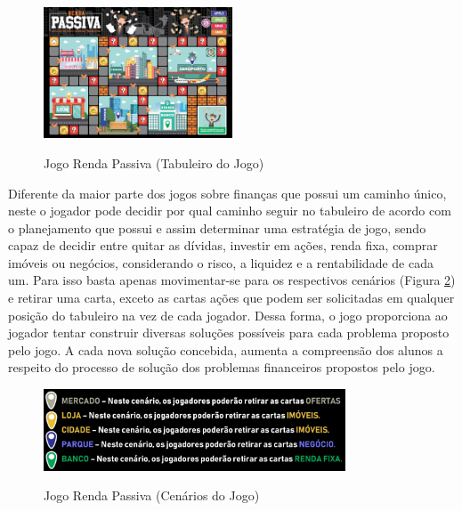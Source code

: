 \graphicspath{{figuras/}}
\begin{figure}[!ht]
\centering
\begin{minipage}{1.\textwidth}
\caption{Jogo Renda Passiva (Tabuleiro do Jogo)}
\centering
\includegraphics[width=0.5\textwidth]{08-figura_tabuleiro-renda-passiva}
\label{fig: figura08-tabuleiro}
\end{minipage}
\end{figure}

\newpage
Diferente da maior parte dos jogos sobre finanças que possui um caminho único, neste o jogador pode decidir por qual caminho seguir no tabuleiro de acordo com o planejamento que possui e assim determinar uma estratégia de jogo, sendo capaz de decidir entre quitar as dívidas, investir em ações, renda fixa, comprar imóveis ou negócios, considerando o risco, a liquidez e a rentabilidade de cada um. Para isso basta apenas movimentar-se para os respectivos cenários (Figura \ref{fig: figura09-cenario-jogo}) e retirar uma carta, exceto as cartas ações que podem ser solicitadas em qualquer posição do tabuleiro na vez de cada jogador. Dessa forma, o jogo proporciona ao jogador tentar construir diversas soluções possíveis para cada problema proposto pelo jogo. A cada nova solução concebida, aumenta a compreensão dos alunos a respeito do processo de solução dos problemas financeiros propostos pelo jogo.

\graphicspath{{figuras/}}
\begin{figure}[!ht]
\centering
\begin{minipage}{1.\textwidth}
\caption{Jogo Renda Passiva (Cenários do Jogo)}
\centering
\includegraphics[width=0.8\textwidth]{09-figura_cenario-jogo-renda-passiva}
\label{fig: figura09-cenario-jogo}
\end{minipage}
\end{figure}

